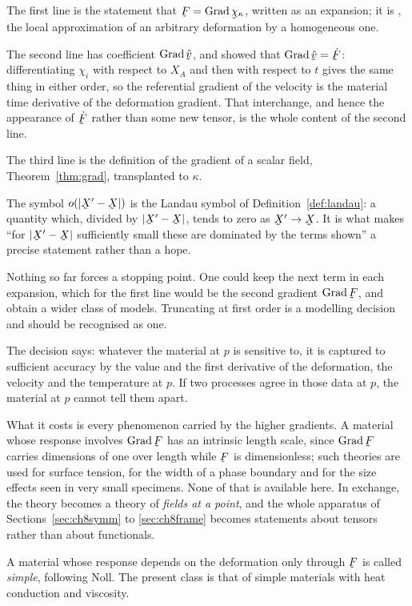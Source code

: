 The first line is the statement that $\bF=\Grad\bchi_{\kappa}$, written
as an expansion; it is , the local approximation of an
arbitrary deformation by a homogeneous one.

The second line has coefficient $\Grad\hat\bv$, and  showed
that $\Grad\hat\bv=\dot\bF$: differentiating $\chi_{i}$ with respect to
$X_{A}$ and then with respect to $t$ gives the same thing in either
order, so the referential gradient of the velocity is the material time
derivative of the deformation gradient. That interchange, and hence the
appearance of $\dot\bF$ rather than some new tensor, is the whole
content of the second line.

The third line is the definition of the gradient of a scalar field,
Theorem~\ref{thm:grad}, transplanted to $\kappa$.

The symbol $o(|\bX'-\bX|)$ is the Landau symbol of
Definition~\ref{def:landau}: a quantity which, divided by $|\bX'-\bX|$,
tends to zero as $\bX'\to\bX$. It is what makes ``for $|\bX'-\bX|$
sufficiently small these are dominated by the terms shown'' a precise
statement rather than a hope.

\begin{remark}
\label{rem:ch8trunc}
Nothing so far forces a stopping point. One could keep the next term in
each expansion, which for the first line would be the second gradient
$\Grad\bF$, and obtain a wider class of models. Truncating at first
order is a modelling decision and should be recognised as one.

The decision says: whatever the material at $p$ is sensitive to, it is
captured to sufficient accuracy by the value and the first derivative of
the deformation, the velocity and the temperature at $p$. If two
processes agree in those data at $p$, the material at $p$ cannot tell
them apart.

What it costs is every phenomenon carried by the higher gradients. A
material whose response involves $\Grad\bF$ has an intrinsic length
scale, since $\Grad\bF$ carries dimensions of one over length while
$\bF$ is dimensionless; such theories are used for surface tension, for
the width of a phase boundary and for the size effects seen in very
small specimens. None of that is available here. In exchange, the
theory becomes a theory of \emph{fields at a point}, and the whole
apparatus of Sections~\ref{sec:ch8symm} to \ref{sec:ch8frame} becomes
statements about tensors rather than about functionals.

A material whose response depends on the deformation only through $\bF$
is called \emph{simple}, following Noll. The present class is that of
simple materials with heat conduction and viscosity.
\end{remark}


